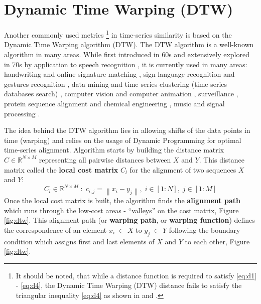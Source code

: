 \section{Dynamic Time Warping (DTW)}
Another commonly used metrics 
\footnote{It should be noted, that while a distance function is required to satisfy \ref{eq:d1} - \ref{eq:d4}, the Dynamic Time Warping (DTW) distance fails to satisfy the triangular inequality \ref{eq:d4} as shown in \cite{citeulike:4343286} and \cite{citeulike:4343933}.}
in time-series similarity is based on the Dynamic Time Warping algorithm (DTW). The DTW algorithm is a well-known algorithm in many areas. While first introduced in 60s \cite{citeulike:3733907} and extensively explored in 70s by application to speech recognition \cite{citeulike:603020}, \cite{citeulike:3496861} it is currently used in many areas: handwriting and online signature matching \cite{citeulike:2838910} \cite{citeulike:2584345}, sign language recognition \cite{citeulike:3789957} and gestures recognition \cite{citeulike:3789964} \cite{citeulike:3789957}, data mining and time series clustering (time series databases search) \cite{citeulike:3815076} \cite{citeulike:3733893} \cite{citeulike:3788783} \cite{citeulike:3731715} \cite{citeulike:3731713} \cite{citeulike:3789897}, computer vision and computer animation \cite{citeulike:3728229}, surveillance \cite{citeulike:964832}, protein sequence alignment and chemical engineering \cite{citeulike:3733894}, music and signal processing \cite{citeulike:3736775} \cite{citeulike:3728229} \cite{citeulike:3728228}.

The idea behind the DTW algorithm lies in allowing shifts of the data points in time (warping) and relies on the usage of Dynamic Programming \cite{citeulike:3733907} for optimal time-series alignment. Algorithm starts by building the distance matrix $C \in \mathbb{R}^{N \times M}$ representing all pairwise distances between $X$ and $Y$. This distance matrix called the \textbf{local cost matrix} $C_{l}$ for the alignment of two sequences $X$ and $Y$:
\begin{equation}
\label{eq:localcost}
C_{l} \in \mathbb{R}^{N \times M} \; : \; c_{i,j} = \left\| x_{i} - y_{j} \right\|, \; i \in [1:N], \; j \in [1:M]
\end{equation}
Once the local cost matrix is built, the algorithm finds the \textbf{alignment path} which runs through the low-cost areas - ``valleys'' on the cost matrix, Figure \ref{fig:dtw}. This alignment path (or \textbf{warping path}, or \textbf{warping function}) defines the correspondence of an element $x_{i} \; \in \; X$ to $y_{j} \; \in \; Y$ following the boundary condition which assigns first and last elements of $X$ and $Y$ to each other, Figure \ref{fig:dtw}.

